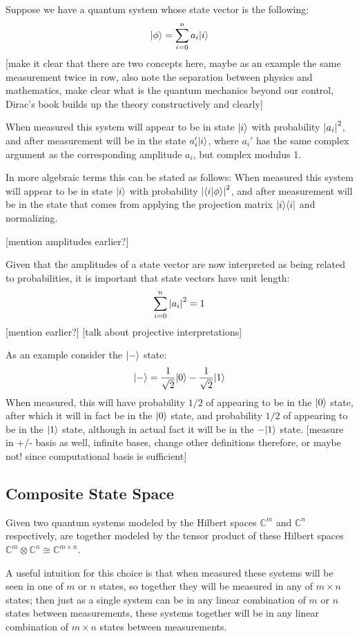 Suppose we have a quantum system whose state vector is the following:
\[| \phi \rangle = \sum_{i=0}^n a_i| i \rangle\]
[make it clear that there are two concepts here, maybe as an example the same measurement twice in row, also note the separation between physics and mathematics, make clear what is the quantum mechanics beyond our control, Dirac's book builds up the theory constructively and clearly]

When measured this system will appear to be in state $| i \rangle$ with probability $\left| a_i \right|^2$, and after measurement will be in the state $a_i'| i \rangle$, where $a_i'$ has the same complex argument as the corresponding amplitude $a_i$, but complex modulus 1.

In more algebraic terms this can be stated as follows:
When measured this system will appear to be in state $| i \rangle$ with probability $\left| \langle i | \phi \rangle \right|^2$, and after measurement will be in the state that comes from applying the projection matrix $| i \rangle\langle i |$ and normalizing.

[mention amplitudes earlier?]

Given that the amplitudes of a state vector are now interpreted as being related to probabilities, it is important that state vectors have unit length:
\[\sum_{i=0}^n \left| a_i \right|^2 = 1\]
[mention earlier?]
[talk about projective interpretations]

As an example consider the $| - \rangle$ state:
\[| - \rangle=\frac{1}{\sqrt{2}}| 0 \rangle - \frac{1}{\sqrt{2}}| 1 \rangle\]
When measured, this will have probability $1/2$ of appearing to be in the $| 0 \rangle$ state, after which it will in fact be in the $| 0 \rangle$ state, and probability $1/2$ of appearing to be in the $| 1 \rangle$ state, although in actual fact it will be in the $-| 1 \rangle$ state.
[measure in +/- basis as well, infinite bases, change other definitions therefore, or maybe not! since computational basis is sufficient]
\subsection{Composite State Space}
Given two quantum systems modeled by the Hilbert spaces $\mathbb{C}^m$ and $\mathbb{C}^n$ respectively, are together modeled by the tensor product of these Hilbert spaces $\mathbb{C}^m \otimes \mathbb{C}^n \cong \mathbb{C}^{m \times n}$.

A useful intuition for this choice is that when measured these systems will be seen in one of $m$ or $n$ states, so together they will be measured in any of $m \times n$ states; then just as a single system can be in any linear combination of $m$ or $n$ states between measurements, these systems together will be in any linear combination of $m\times n$ states between measurements.

